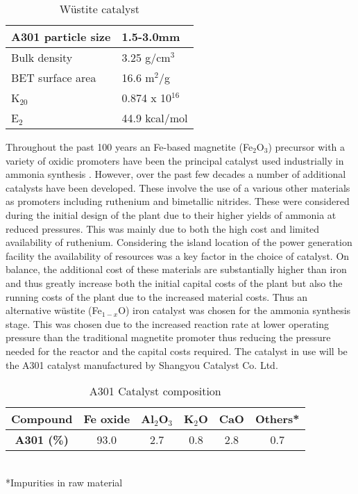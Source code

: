 \begin{wraptable}{r}{0.4\textwidth}
	{\singlespacing
\centering
		\caption{W\"{u}stite catalyst \cite{Pernicone2003}}
		\begin{tabular}{ |l|l|  }
			\hline
			A301 particle size & 1.5-3.0mm\\
			\hline
			Bulk density & 3.25 g/cm$^3$\\
			\hline
			BET surface area & 16.6 m$^2$/g\\
			\hline
			K$_{20}$&  0.874 x 10$^{16}$\\
			\hline
			E$_2$ &44.9 kcal/mol \\
			\hline
		\end{tabular}
}
\end{wraptable}
Throughout the past 100 years an Fe-based magnetite (Fe$_{2}$O$_3$) precursor with a variety of oxidic promoters have been the principal catalyst used industrially in ammonia synthesis \cite{Liu2014}. However, over the past few decades a number of additional catalysts have been developed. These involve the use of a various other materials as promoters including ruthenium and bimetallic nitrides. These were considered during the initial design of the plant due to their higher yields of ammonia at reduced pressures. This was mainly due to both the high cost and limited availability of ruthenium. Considering the island location of the power generation facility the availability of resources was a key factor in the choice of catalyst. On balance, the additional cost of these materials are substantially higher than iron and thus greatly increase both the initial capital costs of the plant but also the running costs of the plant due to the increased material costs. Thus an alternative w\"{u}stite (Fe$_{1-x}$O) iron catalyst was chosen for the ammonia synthesis stage. This was chosen due to the increased reaction rate at lower operating pressure than the traditional magnetite promoter thus reducing the pressure needed for the reactor and the capital costs required. The catalyst in use will be the A301 catalyst manufactured by Shangyou Catalyst Co. Ltd. 

\begin{table}[!htbp]
	\begin{center}
		\caption{A301 Catalyst composition}
		\begin{tabular}{ |c|c|c|c|c|c| }
			
			\hline
			\textbf{Compound} &Fe oxide & Al$_2$O$_3$ & K$_2$O & CaO & Others*\\
				\hline
			\textbf{A301 (\%)} &93.0 & 2.7 & 0.8 & 2.8 & 0.7\\
			\hline
		\end{tabular}
	\small
	\\
	*Impurities in raw material
	\end{center}
\end{table}

